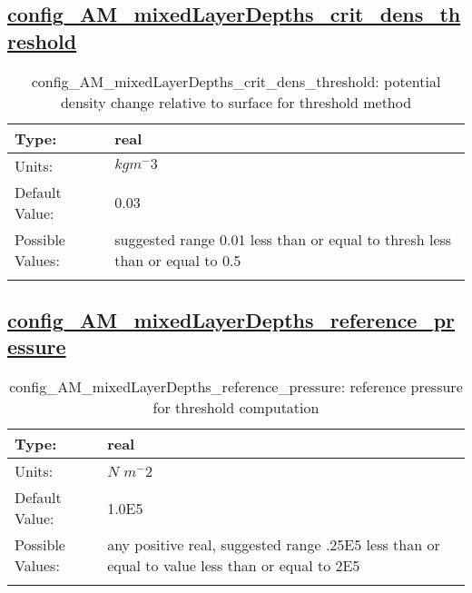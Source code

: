 \subsection[config\_AM\_mixedLayerDepths\_crit\_dens\_threshold]{\hyperref[sec:nm_tab_AM_mixedLayerDepths]{config\_AM\_mixedLayerDepths\_crit\_dens\_threshold}}
\label{subsec:nm_sec_config_AM_mixedLayerDepths_crit_dens_threshold}
\begin{center}
\begin{longtable}{| p{2.0in} || p{4.0in} |}
    \hline
    Type: & real \\
    \hline
    Units: & $kgm^-3$ \\
    \hline
    Default Value: & 0.03 \\
    \hline
    Possible Values: & suggested range 0.01 less than or equal to thresh less than or equal to 0.5 \\
    \hline
    \caption{config\_AM\_mixedLayerDepths\_crit\_dens\_threshold: potential density change relative to surface for threshold method}
\end{longtable}
\end{center}
\subsection[config\_AM\_mixedLayerDepths\_reference\_pressure]{\hyperref[sec:nm_tab_AM_mixedLayerDepths]{config\_AM\_mixedLayerDepths\_reference\_pressure}}
\label{subsec:nm_sec_config_AM_mixedLayerDepths_reference_pressure}
\begin{center}
\begin{longtable}{| p{2.0in} || p{4.0in} |}
    \hline
    Type: & real \\
    \hline
    Units: & $N$ $m^-2$ \\
    \hline
    Default Value: & 1.0E5 \\
    \hline
    Possible Values: & any positive real, suggested range .25E5 less than or equal to value less than or equal to 2E5 \\
    \hline
    \caption{config\_AM\_mixedLayerDepths\_reference\_pressure: reference pressure for threshold computation}
\end{longtable}
\end{center}

